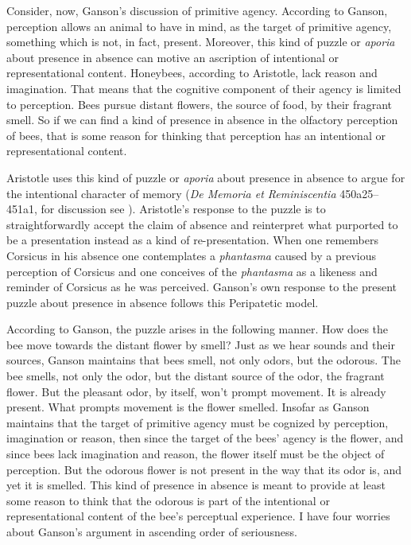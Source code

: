 \documentclass[12pt]{article}
\begin{document}
Consider, now,  Ganson's discussion of primitive agency. According to Ganson, perception allows an animal to have in mind, as the target of primitive agency, something which is not, in fact, present. Moreover, this kind of puzzle or \emph{aporia} about presence in absence can motive an ascription of intentional or representational content. Honeybees, according to Aristotle, lack reason and imagination. That means that the cognitive component of their agency is limited to perception. Bees pursue distant flowers, the source of food, by their fragrant smell. So if we can find a kind of presence in absence in the olfactory perception of bees, that is some reason for thinking that perception has an intentional or representational content. 

Aristotle uses this kind of puzzle or \emph{aporia} about presence in absence to argue for the intentional character of memory (\emph{De Memoria et Reminiscentia} 450a25–451a1, for discussion see \citealt{Sorabji:2004qa}). Aristotle's response to the puzzle is to straightforwardly accept the claim of absence and reinterpret what purported to be a presentation instead as a kind of re-presentation. When one remembers Corsicus in his absence one contemplates a \emph{phantasma} caused by a previous perception of Corsicus and one conceives of the \emph{phantasma} as a likeness and reminder of Corsicus as he was perceived. Ganson's own response to the present puzzle about presence in absence follows this Peripatetic model.

According to Ganson, the puzzle arises in the following manner. How does the bee move towards the distant flower by smell? Just as we hear sounds and their sources, Ganson maintains that bees smell, not only odors, but the odorous. The bee smells, not only the odor, but the distant source of the odor, the fragrant flower. But the pleasant odor, by itself, won't prompt movement. It is already present. What prompts movement is the flower smelled. Insofar as Ganson maintains that the target of primitive agency must be cognized by perception, imagination or reason, then since the target of the bees' agency is the flower, and since bees lack imagination and reason, the flower itself must be the object of perception. But the odorous flower is not present in the way that its odor is, and yet it is smelled. This kind of presence in absence is meant to provide at least some reason to think that the odorous is part of the intentional or representational content of the bee's perceptual experience. I have four worries about Ganson's argument in ascending order of seriousness.
\end{document}
